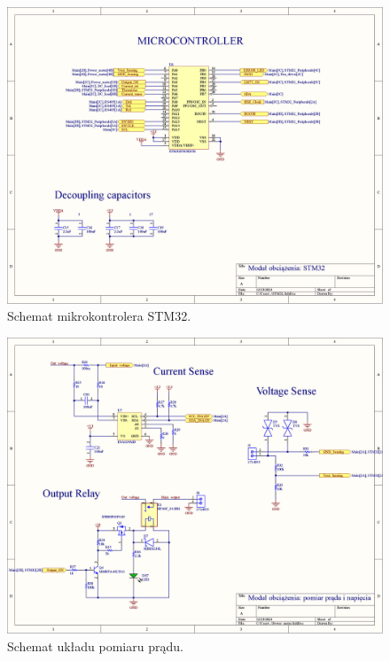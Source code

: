 \begin{figure}
    \begin{center}
        \includegraphics[width = 21cm]{zalaczniki/obciazenie/Obciążenie_aktywne_Strona_06.jpg}
        \caption{Schemat mikrokontrolera STM32.}
    \end{center}
\end{figure}

\begin{figure}
    \begin{center}
        \includegraphics[width = 21cm]{zalaczniki/obciazenie/Obciążenie_aktywne_Strona_07.jpg}
        \caption{Schemat układu pomiaru prądu.}
    \end{center}
\end{figure}

